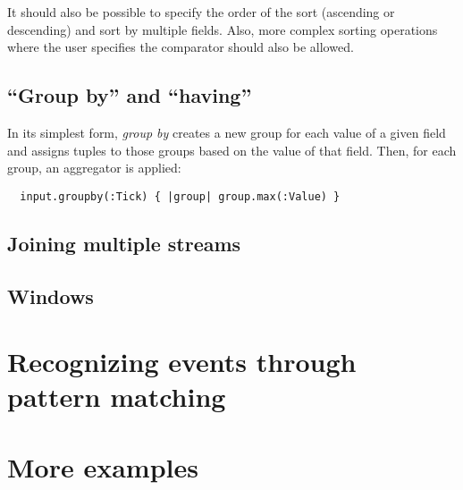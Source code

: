 \documentclass[twoside]{report}
\begin{document}
It should also be possible to specify the order of the sort (ascending or descending) and sort by multiple fields. Also, more complex sorting operations where the user specifies the comparator should also be allowed.

\section{``Group by'' and ``having''}

In its simplest form, \emph{group by} creates a new group for each value of a given field and assigns tuples to those groups based on the value of that field. Then, for each group, an aggregator is applied:

\begin{verbatim}
  input.groupby(:Tick) { |group| group.max(:Value) }
\end{verbatim}


\section{Joining multiple streams}
\section{Windows}

\chapter{Recognizing events through pattern matching}
\chapter{More examples}
\end{document}
